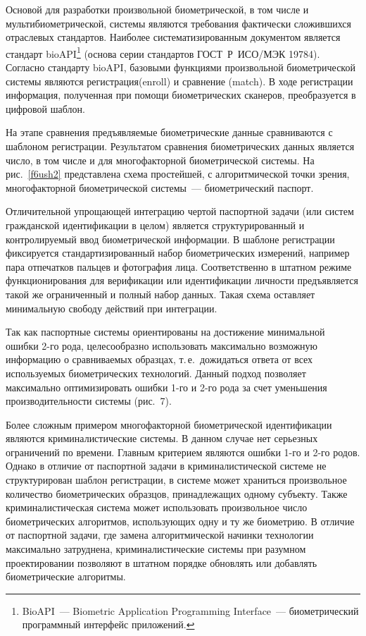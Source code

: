 \begin{multicols}{2}
Основой для разработки произвольной био\-мет\-ри\-че\-ской, в том числе и 
муль\-ти\-био\-мет\-ри\-че\-ской, системы являются требования фактически 
сложившихся отраслевых стандартов.\linebreak
 Наиболее систематизированным 
документом является стандарт bioAPI\footnote{BioAPI~--- Biometric Application
Programming Interface~--- биометрический программный интерфейс приложений.} 
(основа серии стандартов 
ГОСТ~Р~ИСО/МЭК 19784). Согласно стандарту bioAPI, базовыми функциями 
произвольной биометрической системы являются регистрация\linebreak (enroll) и 
сравнение (match). В ходе регистрации  информация, полученная  при помощи 
биометрических сканеров, преобразуется в циф\-ро\-вой шаб\-лон.


  
  На этапе сравнения предъявляемые биометрические данные сравниваются с 
шаблоном регистрации. Результатом сравнения биометрических %
 данных 
является число, в том числе и для многофакторной биометрической системы. 
На рис.~\ref{f6ush2} пред\-став\-ле\-на схема простейшей, с алгоритмической точки 
зрения, многофакторной  биометрической системы~--- биометрический 
паспорт. 
  
  Отличительной упрощающей интеграцию чертой паспортной задачи (или 
систем гражданской идентификации в целом) является структурированный и 
контролируемый ввод биометрической информации. В шаблоне регистрации 
фиксируется стандартизированный набор биометрических измерений, 
например пара отпечатков пальцев и фотография лица. Соответственно в 
штатном режиме функционирования для верификации или идентификации 
личности предъявляется такой же ограниченный и полный набор данных. Такая 
схема оставляет минимальную свободу действий при интеграции. 

 
  Так как паспортные системы ориентированы на достижение минимальной 
ошибки 2-го рода, целесообразно использовать максимально возможную 
информацию о сравниваемых образцах, т.\,е.\ дожидаться ответа от всех 
используемых биометрических технологий. Данный подход позволяет 
максимально оптимизировать ошибки 1-го и 2-го рода за счет уменьшения 
производительности системы (рис.~7).
{ %

}
 
  Более сложным примером многофакторной биометрической идентификации 
являются криминалистические системы. В данном случае нет серь\-ез\-ных 
ограничений по времени. Главным критерием являются ошибки 1-го и 2-го 
родов. Однако в отличие от паспортной задачи в криминалистической системе 
не структурирован шаблон регистрации, в системе может храниться 
произвольное коли\-че\-ст\-во биометрических образцов, принадлежащих одному 
субъекту. Также криминалистическая система может использовать
произвольное число био\-мет\-ри\-че\-ских алгоритмов, использующих одну и ту же 
биометрию. В отличие от паспортной задачи, где замена алгоритмической 
начинки технологии максимально затруднена, криминалистические сис\-те\-мы 
при разумном проектировании позволяют в штатном порядке обновлять или 
добавлять био\-мет\-ри\-че\-ские алгоритмы.
  

\end{multicols}
